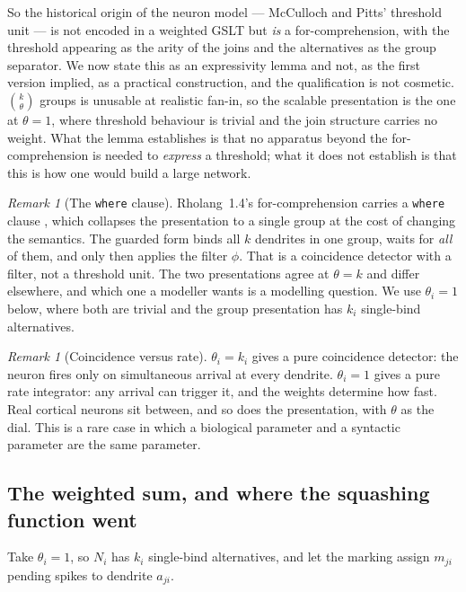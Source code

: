 \documentclass[11pt,a4paper]{article}
\theoremstyle{plain}
\theoremstyle{definition}
\theoremstyle{remark}
\newtheorem{remark}[theorem]{Remark}
\begin{document}
So the historical origin of the neuron model --- McCulloch and Pitts' threshold unit \cite{mcp} ---
is not encoded in a weighted GSLT but \emph{is} a for-comprehension, with the threshold appearing as
the arity of the joins and the alternatives as the group separator. We now state this as an
expressivity lemma and not, as the first version implied, as a practical construction, and the
qualification is not cosmetic. $\binom{k}{\theta}$ groups is unusable at realistic fan-in, so the
scalable presentation is the one at $\theta = 1$, where threshold behaviour is trivial and the join
structure carries no weight. What the lemma establishes is that no apparatus beyond the
for-comprehension is needed to \emph{express} a threshold; what it does not establish is that this is
how one would build a large network.

\begin{remark}[The \texttt{where} clause]
Rholang~1.4's for-comprehension carries a \texttt{where} clause \cite{omnibus}, which collapses the
presentation to a single group at the cost of changing the semantics. The guarded form binds all
$k$ dendrites in one group, waits for \emph{all} of them, and only then applies the filter $\phi$.
That is a coincidence detector with a filter, not a threshold unit. The two
presentations agree at $\theta = k$ and differ elsewhere, and which one a modeller wants is a
modelling question. We use $\theta_i = 1$ below, where both are trivial and the group presentation
has $k_i$ single-bind alternatives.
\end{remark}

\begin{remark}[Coincidence versus rate]
$\theta_i = k_i$ gives a pure coincidence detector: the neuron fires only on simultaneous arrival at
every dendrite. $\theta_i = 1$ gives a pure rate integrator: any arrival can trigger it, and the
weights determine how fast. Real cortical neurons sit between, and so does the presentation, with
$\theta$ as the dial. This is a rare case in which a biological parameter and a syntactic parameter
are the same parameter.
\end{remark}

\subsection{The weighted sum, and where the squashing function went}
\label{sec:squash}

Take $\theta_i = 1$, so $N_i$ has $k_i$ single-bind alternatives, and let the marking assign $m_{ji}$
pending spikes to dendrite $a_{ji}$.
\end{document}
